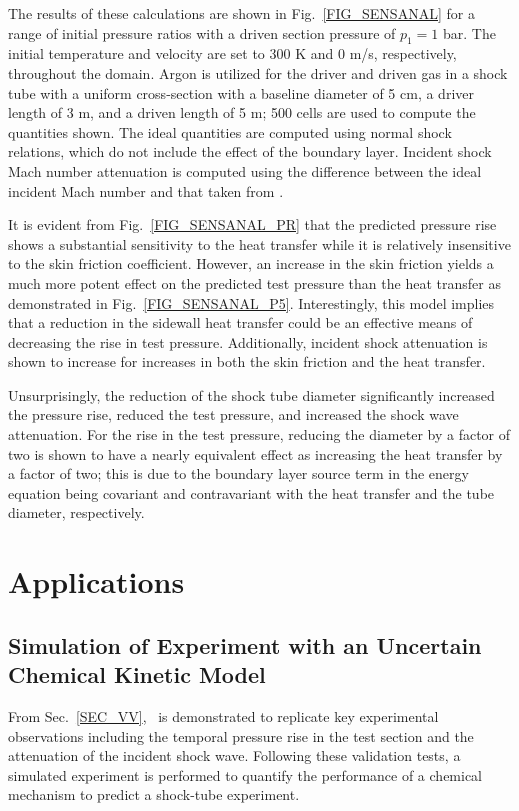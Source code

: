 The results of these calculations are shown in Fig.~\ref{FIG_SENSANAL} for a range of initial pressure ratios with a driven section pressure of $p_1=1$ bar. The initial temperature and velocity are set to 300 K and 0 m/s, respectively, throughout the domain. Argon is utilized for the driver and driven gas in a shock tube with a uniform cross-section with a baseline diameter of 5 cm, a driver length of 3 m, and a driven length of 5 m; 500 cells are used to compute the quantities shown. The ideal quantities are computed using normal shock relations, which do not include the effect of the boundary layer. Incident shock Mach number attenuation is computed using the difference between the ideal incident Mach number and that taken from \stnshk.

It is evident from Fig.~\ref{FIG_SENSANAL_PR} that the predicted pressure rise shows a substantial sensitivity to the heat transfer while it is relatively insensitive to the skin friction coefficient. However, an increase in the skin friction yields a much more potent effect on the predicted test pressure than the heat transfer as demonstrated in Fig.~\ref{FIG_SENSANAL_P5}. Interestingly, this model implies that a reduction in the sidewall heat transfer could be an effective means of decreasing the rise in test pressure. Additionally, incident shock attenuation is shown to increase for increases in both the skin friction and the heat transfer.

 Unsurprisingly, the reduction of the shock tube diameter significantly increased the pressure rise, reduced the test pressure, and increased the shock wave attenuation. For the rise in the test pressure, reducing the diameter by a factor of two is shown to have a nearly equivalent effect as increasing the heat transfer by a factor of two; this is due to the boundary layer source term in the energy equation being covariant and contravariant with the heat transfer and the tube diameter, respectively. 


\section{Applications}\label{SEC_APPLICATIONS}
\subsection{Simulation of Experiment with an Uncertain Chemical Kinetic Model}
From Sec.~\ref{SEC_VV}, \stnshk\ is demonstrated to replicate key experimental observations including the temporal pressure rise in the test section and the attenuation of the incident shock wave. Following these validation tests, a simulated experiment is performed to quantify the performance of a chemical mechanism to predict a shock-tube experiment. 

